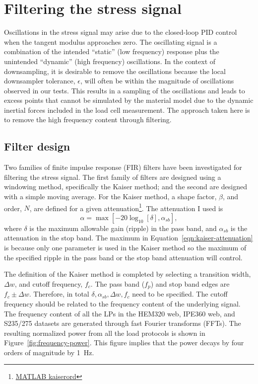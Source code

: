 \documentclass[a4paper,11pt]{article}
\begin{document}



\clearpage
\appendix

\section{Filtering the stress signal}
\label{sec:filtering}

Oscillations in the stress signal may arise due to the closed-loop PID control when the tangent modulus approaches zero.
The oscillating signal is a combination of the intended ``static'' (low frequency) response plus the unintended ``dynamic'' (high frequency) oscillations.
In the context of downsampling, it is desirable to remove the oscillations because the local downsampler tolerance, $\epsilon$, will often be within the magnitude of oscillations observed in our tests.
This results in a sampling of the oscillations and leads to excess points that cannot be simulated by the material model due to the dynamic inertial forces included in the load cell measurement.
The approach taken here is to remove the high frequency content through filtering.


\subsection{Filter design}
\label{sec:filter-design}

Two families of finite impulse response (FIR) filters have been investigated for filtering the stress signal.
The first family of filters are designed using a windowing method, specifically the Kaiser method; and the second are designed with a simple moving average.
For the Kaiser method, a shape factor, $\beta$, and order, $N$, are defined for a given attenuation\footnote{\href{https://ch.mathworks.com/help/signal/ref/kaiserord.html}{MATLAB kaiserord}}.
The attenuation I used is
\begin{equation}
    \label{eqn:kaiser-attenuation}
    \alpha = \max \left[ -20 \log_{10}[\delta] , \alpha_{sb} \right],
\end{equation}
where $\delta$ is the maximum allowable gain (ripple) in the pass band, and $\alpha_{sb}$ is the attenuation in the stop band.
The maximum in Equation~\ref{eqn:kaiser-attenuation} is because only one parameter is used in the Kaiser method so the maximum of the specified ripple in the pass band or the stop band attenuation will control.

The definition of the Kaiser method is completed by selecting a transition width, $\Delta w$, and cutoff frequency, $f_c$.
The pass band ($f_p$) and stop band edges are $f_c \pm \Delta w$.
Therefore, in total $\delta, \alpha_{sb}, \Delta w, f_c$ need to be specified.
The cutoff frequency should be related to the frequency content of the underlying signal.
The frequency content of all the LPs in the HEM320 web, IPE360 web, and S235/275 datasets are generated through fast Fourier transforms (FFTs).
The resulting normalized power from all the load protocols is shown in Figure~\ref{fig:frequency-power}.
This figure implies that the power decays by four orders of magnitude by 1~Hz.
\end{document}
